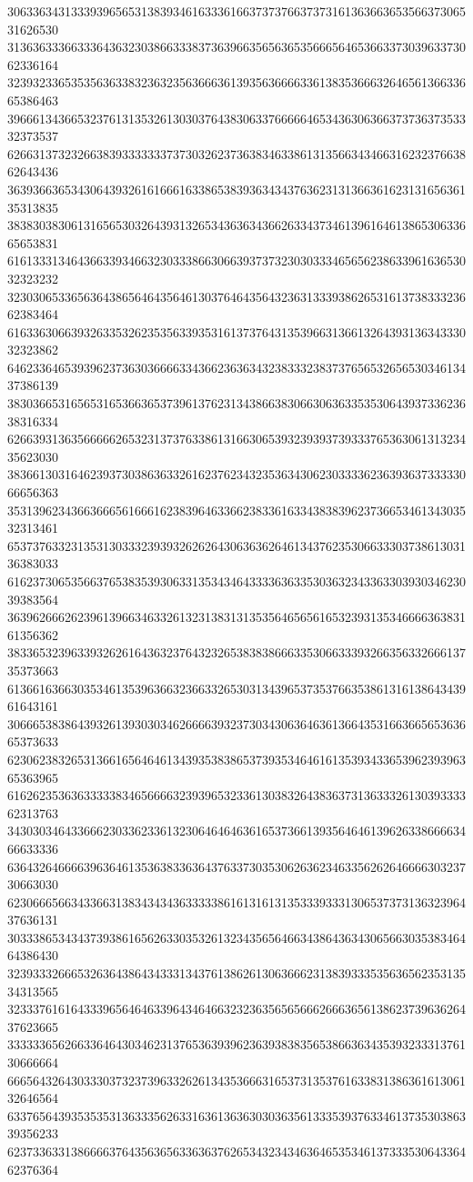 30633634313339396565313839346163336166373737663737316136366365356637306531626530
31363633366333643632303866333837363966356563653566656465366337303963373062336164
32393233653535636338323632356366636139356366663361383536663264656136633665386463
39666134366532376131353261303037643830633766666465343630636637373637353332373537
62663137323266383933333337373032623736383463386131356634346631623237663862643436
36393663653430643932616166616338653839363434376362313136636162313165636135313835
38383038306131656530326439313265343636343662633437346139616461386530633665653831
61613331346436633934663230333866306639373732303033346565623863396163653032323232
32303065336563643865646435646130376464356432363133393862653161373833323662383464
61633630663932633532623535633935316137376431353966313661326439313634333032323862
64623364653939623736303666633436623636343238333238373765653265653034613437386139
38303665316565316536636537396137623134386638306630636335353064393733623638316334
62663931363566666265323137376338613166306539323939373933376536306131323435623030
38366130316462393730386363326162376234323536343062303333623639363733333066656363
35313962343663666561666162383964633662383361633438383962373665346134303532313461
65373763323135313033323939326262643063636264613437623530663330373861303136383033
61623730653566376538353930633135343464333363633530363234336330393034623039383564
36396266626239613966346332613231383131353564656561653239313534666636383161356362
38336532396339326261643632376432326538383866633530663339326635633266613735373663
61366163663035346135396366323663326530313439653735376635386131613864343961643161
30666538386439326139303034626666393237303430636463613664353166366565363665373633
62306238326531366165646461343935383865373935346461613539343365396239396365363965
61626235363633333834656666323939653233613038326438363731363332613039333362313763
34303034643366623033623361323064646463616537366139356464613962633866663466633336
63643264666639636461353638336364376337303530626362346335626264666630323730663030
62306665663433663138343434363333386161316131353339333130653737313632396437636131
30333865343437393861656263303532613234356564663438643634306566303538346464386430
32393332666532636438643433313437613862613063666231383933353563656235313534313565
32333761616433396564646339643464663232363565656662666365613862373963626437623665
33333365626633646430346231376536393962363938383565386636343539323331376130666664
66656432643033303732373963326261343536663165373135376163383138636161306132646564
63376564393535353136333562633163613636303036356133353937633461373530386339356233
62373363313866663764356365633636376265343234346364653534613733353064336462376364
